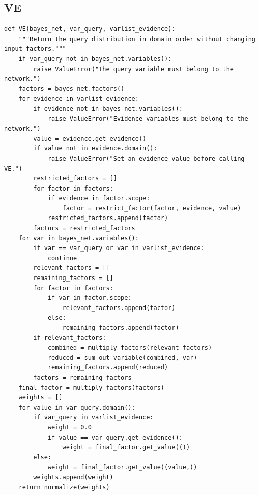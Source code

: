 \documentclass[11pt,a4paper]{article}
\begin{document}
\subsection{VE}
\begin{lstlisting}
def VE(bayes_net, var_query, varlist_evidence):
    """Return the query distribution in domain order without changing input factors."""
    if var_query not in bayes_net.variables():
        raise ValueError("The query variable must belong to the network.")
    factors = bayes_net.factors()
    for evidence in varlist_evidence:
        if evidence not in bayes_net.variables():
            raise ValueError("Evidence variables must belong to the network.")
        value = evidence.get_evidence()
        if value not in evidence.domain():
            raise ValueError("Set an evidence value before calling VE.")
        restricted_factors = []
        for factor in factors:
            if evidence in factor.scope:
                factor = restrict_factor(factor, evidence, value)
            restricted_factors.append(factor)
        factors = restricted_factors
    for var in bayes_net.variables():
        if var == var_query or var in varlist_evidence:
            continue
        relevant_factors = []
        remaining_factors = []
        for factor in factors:
            if var in factor.scope:
                relevant_factors.append(factor)
            else:
                remaining_factors.append(factor)
        if relevant_factors:
            combined = multiply_factors(relevant_factors)
            reduced = sum_out_variable(combined, var)
            remaining_factors.append(reduced)
        factors = remaining_factors
    final_factor = multiply_factors(factors)
    weights = []
    for value in var_query.domain():
        if var_query in varlist_evidence:
            weight = 0.0
            if value == var_query.get_evidence():
                weight = final_factor.get_value(())
        else:
            weight = final_factor.get_value((value,))
        weights.append(weight)
    return normalize(weights)
\end{lstlisting}
\end{document}
